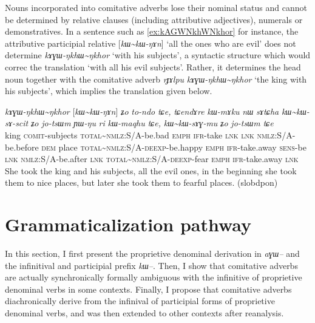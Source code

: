 \documentclass[oldfontcommands,oneside,a4paper,11pt]{article}
\newcommand{\ipa}[1]{{\phon\textit{#1}}} %
\newcommand{\tld}{\textasciitilde{}}
\begin{document}
Nouns incorporated into comitative adverbs lose their nominal status and cannot be determined by relative clauses (including attributive adjectives), numerals or demonstratives. In a sentence such as \ref{ex:kAGWNkhWNkhor} for instance, the attributive participial relative [\ipa{kɯ\tld{}kɯ-ŋɤn}] `all the ones who are evil' does not determine \ipa{kɤɣɯ-ŋkhɯ\tld{}ŋkhor} `with his subjects', a syntactic structure which would correc the translation `with all his evil subjects'. Rather, it determines the head noun together with the comitative adverb  \ipa{rɟɤlpu} \ipa{kɤɣɯ-ŋkhɯ\tld{}ŋkhor} `the king with his subjects', which implies the translation given below.

\begin{exe}
\ex \label{ex:kAGWNkhWNkhor}
\gll \ipa{rɟɤlpu}  	\ipa{kɤɣɯ-ŋkhɯ\tld{}ŋkhor}  	[\ipa{kɯ\tld{}kɯ-ŋɤn}]  	\ipa{ʑo}  	\ipa{to-ndo}  	\ipa{tɕe,}  	\ipa{tɕendɤre}  	\ipa{kɯ-mɤku}  	\ipa{nɯ}  	\ipa{sɤtɕha}  	\ipa{kɯ\tld{}kɯ-sɤ-scit}  	\ipa{ʑo}  	\ipa{jo-tsɯm}  	\ipa{ɲɯ-ŋu}  	\ipa{ri}  	\ipa{kɯ-maqhu}  	\ipa{tɕe,}  	\ipa{kɯ\tld{}kɯ-sɤɣ-mu}  	\ipa{ʑo}  	\ipa{jo-tsɯm}  	\ipa{tɕe}  \\
king \textsc{comit}-subjects \textsc{total}\tld{}\textsc{nmlz}:S/A-be.bad \textsc{emph} \textsc{ifr}-take \textsc{lnk}  \textsc{lnk} \textsc{nmlz}:S/A-be.before \textsc{dem} place \textsc{total}\tld{}\textsc{nmlz}:S/A-\textsc{deexp}-be.happy \textsc{emph} \textsc{ifr}-take.away \textsc{sens}-be \textsc{lnk} \textsc{nmlz}:S/A-be.after \textsc{lnk} \textsc{total}\tld{}\textsc{nmlz}:S/A-\textsc{deexp}-fear \textsc{emph} \textsc{ifr}-take.away \textsc{lnk} \\
\glt She took the king and his subjects, all the evil ones, in the beginning she took them to nice places, but later she took them to fearful places. (slobdpon)
\end{exe}


\section{Grammaticalization pathway} 
In this section, I first present the proprietive denominal derivation in \ipa{aɣɯ--} and the infinitival and participial prefix \ipa{kɯ--}. Then, I show that comitative adverbs are actually synchronically formally ambiguous with the infinitive of proprietive denominal verbs in some contexts. Finally, I propose that comitative adverbs diachronically derive from the infinival of participial forms of proprietive denominal verbs, and was then extended to other contexts after reanalysis.
\end{document}
